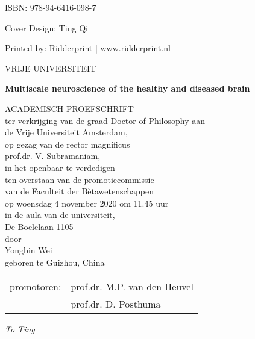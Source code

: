 \documentclass[10pt,twoside,final]{book}
\def\maintitle{Multiscale neuroscience of the healthy and diseased brain}
\begin{document}
\vspace{0.5cm}
\noindent
ISBN: 978-94-6416-098-7 

\noindent
Cover Design: Ting Qi 

\noindent
Printed by: Ridderprint | www.ridderprint.nl


\newpage

\begin{center}
\selectfont	
\vspace*{1cm}
VRIJE UNIVERSITEIT\\
\vspace{2cm}
{\Large\bfseries\maintitle\par}
\vspace{2cm}
ACADEMISCH PROEFSCHRIFT\\
\vspace{0.5cm}
ter verkrijging van de graad Doctor of Philosophy aan\\
de Vrije Universiteit Amsterdam,\\
op gezag van de rector magnificus\\
prof.dr. V. Subramaniam,\\
in het openbaar te verdedigen\\
ten overstaan van de promotiecommissie\\
van de Faculteit der Bètawetenschappen\\
op woensdag 4 november 2020 om 11.45 uur\\
in de aula van de universiteit,\\
De Boelelaan 1105\\
\vspace{3cm}
door\\
\vspace{0.4cm}
Yongbin Wei\\
\vspace{0.4cm}
geboren te Guizhou, China\\  
\end{center}
\newpage

\selectfont	
\begin{tabular}{ll}
promotoren: & prof.dr. M.P. van den Heuvel\\
 & prof.dr. D. Posthuma
\end{tabular}
\newpage

\pagestyle{empty}
\selectfont	
\begin{center}
    \normalsize
    \vspace*{7cm}
    \textit{To Ting}
\end{center}
\newpage
\newpage\null\newpage
\end{document}
